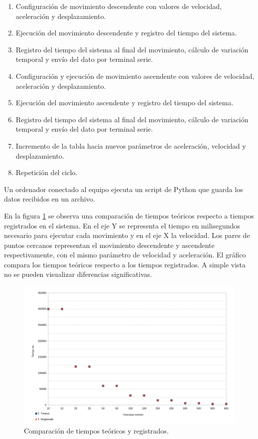 \begin{enumerate}
\item Configuración de movimiento descendente con valores de velocidad, aceleración y desplazamiento.
\item Ejecución del movimiento descendente y registro del tiempo del sistema.
\item Registro del tiempo del sistema al final del movimiento, cálculo de variación temporal y envío del dato por terminal serie.
\item Configuración y ejecución de movimiento ascendente con valores de velocidad, aceleración y desplazamiento.
\item Ejecución del movimiento ascendente y registro del tiempo del sistema.
\item Registro del tiempo del sistema al final del movimiento, cálculo de variación temporal y envío del dato por terminal serie.
\item Incremento de la tabla hacia nuevos parámetros de aceleración, velocidad y desplazamiento.
\item Repetición del ciclo.
\end{enumerate}

Un ordenador conectado al equipo ejecuta un script de Python que guarda los datos recibidos en un archivo.

En la figura \ref{fig:tiempo_movimiento_1} se observa una comparación de tiempos teóricos respecto a  tiempos registrados en el sistema. En el eje Y se representa el tiempo en milisegundos necesario para ejecutar cada movimiento y en el eje X la velocidad. Los pares de puntos cercanos representan el movimiento descendente y ascendente respectivamente, con el mismo parámetro de velocidad y aceleración. El gráfico compara los tiempos teóricos respecto a los tiempos registrados. A simple vista no se pueden visualizar diferencias significativas.

\begin{figure}[h!]
\centering 
\includegraphics[width=1\textwidth]{./Figures/tiempo_movimiento_1.png}
\caption{Comparación de tiempos teóricos y registrados.}
\label{fig:tiempo_movimiento_1}
\end{figure}

